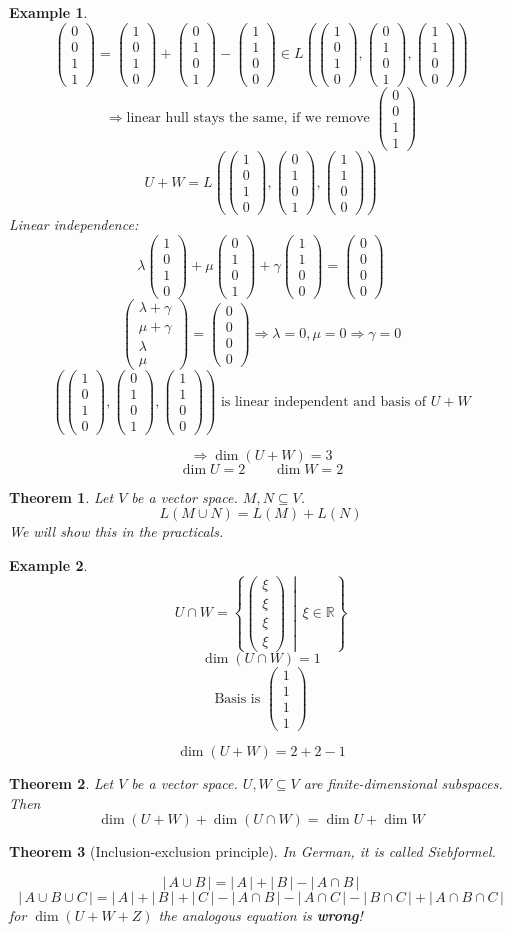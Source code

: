 \documentclass[a4paper,landscape,twocolumn]{article}
\newcommand\setdef[2]{\left\{#1\,\middle|\,#2\right\}}
\newcommand\card[1]{\left|\,#1\,\right|}
\newcommand\vecfour[4]{\begin{pmatrix} #1 \\ #2 \\ #3 \\ #4 \end{pmatrix}}
\newtheorem{theorem}{Theorem}
\newtheorem{ex}{Example}
\begin{document}
\begin{ex}
  \[ \vecfour 0011 = \vecfour 1010 + \vecfour 0101 - \vecfour 1100 \in L\left(\vecfour 1010, \vecfour 0101, \vecfour 1100\right) \]
  \[ \Rightarrow \text{linear hull stays the same, if we remove } \vecfour 0011 \]
  \[ U+W = L\left(\vecfour 1010, \vecfour 0101, \vecfour 1100\right) \]
  Linear independence:
  \[ \lambda \vecfour 1010 + \mu \vecfour 0101 + \gamma \vecfour 1100 = \vecfour 0000 \]
  \[ \vecfour{\lambda+\gamma}{\mu+\gamma}{\lambda}{\mu} = \vecfour 0000 \Rightarrow \lambda = 0, \mu = 0 \Rightarrow \gamma = 0 \]
  \[ \left(\vecfour 1010, \vecfour 0101, \vecfour 1100\right) \text{ is linear independent and basis of } U + W \]

  \[ \Rightarrow \dim(U + W) = 3 \]
  \[ \dim{U} = 2 \qquad \dim{W} = 2 \]
\end{ex}

\begin{theorem}
  \label{lemma-4-4}
  Let $V$ be a vector space. $M, N \subseteq V$.
  \[ L(M \cup N) = L(M) + L(N) \]
  We will show this in the practicals.
\end{theorem}

\begin{ex}
  \[ U \cap W = \setdef{\vecfour{\xi}{\xi}{\xi}{\xi}}{\xi \in \mathbb R} \]
  \[ \dim(U \cap W) = 1 \]
  \[ \text{Basis is } \vecfour 1111 \]

  \[ \dim(U+W) = 2 + 2 - 1 \]
\end{ex}

\begin{theorem}
  Let $V$ be a vector space. $U, W \subseteq V$ are finite-dimensional subspaces.
  Then
  \[ \dim(U + W) + \dim(U \cap W) = \dim U + \dim W \]
\end{theorem}

\begin{theorem}[Inclusion-exclusion principle]
  \label{inclusion-exclusion}
  In German, it is called \foreignlanguage{ngerman}{Siebformel}.

  \[ \card{A \cup B} = \card{A} + \card{B} - \card{A \cap B} \]
  \[ \card{A \cup B \cup C} = \card{A} + \card{B} + \card{C} - \card{A \cap B} - \card{A \cap C} - \card{B \cap C} + \card{A \cap B \cap C} \]
  for $\dim(U + W + Z)$ the analogous equation is \textbf{wrong}!
\end{theorem}
\end{document}
